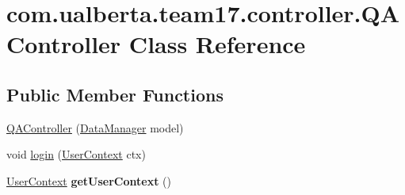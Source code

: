 \hypertarget{classcom_1_1ualberta_1_1team17_1_1controller_1_1_q_a_controller}{\section{com.\+ualberta.\+team17.\+controller.\+Q\+A\+Controller Class Reference}
\label{classcom_1_1ualberta_1_1team17_1_1controller_1_1_q_a_controller}
}
\subsection*{Public Member Functions}
\begin{DoxyCompactItemize}
\item 
\hyperlink{classcom_1_1ualberta_1_1team17_1_1controller_1_1_q_a_controller_a2de23e7026d66c03fcbb5f1e1c51616f}{Q\+A\+Controller} (\hyperlink{classcom_1_1ualberta_1_1team17_1_1datamanager_1_1_data_manager}{Data\+Manager} model)
\item 
void \hyperlink{classcom_1_1ualberta_1_1team17_1_1controller_1_1_q_a_controller_a98fbe420f8061f86226a1d2547d1fc0e}{login} (\hyperlink{classcom_1_1ualberta_1_1team17_1_1datamanager_1_1_user_context}{User\+Context} ctx)
\item 
\hypertarget{classcom_1_1ualberta_1_1team17_1_1controller_1_1_q_a_controller_a332d2728d057b7706d4ee6109ac323b9}{\hyperlink{classcom_1_1ualberta_1_1team17_1_1datamanager_1_1_user_context}{User\+Context} {\bfseries get\+User\+Context} ()}\label{classcom_1_1ualberta_1_1team17_1_1controller_1_1_q_a_controller_a332d2728d057b7706d4ee6109ac323b9}


\end{DoxyCompactItemize}
